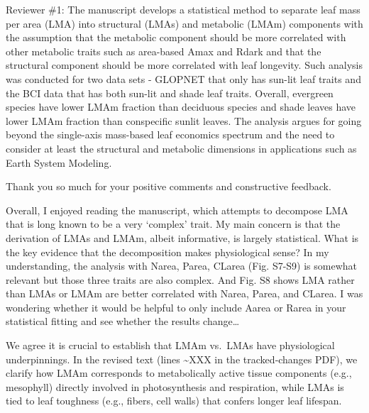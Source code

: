 \documentclass[
  12pt,
  letterpaper,
  DIV=11,
  numbers=noendperiod]{scrartcl}
\renewenvironment{quote}
  {\begin{customblockquote}\color{blockquote-text}\ignorespaces}
  {\end{customblockquote}}
\begin{document}
\begin{quote}
Reviewer \#1: The manuscript develops a statistical method to separate
leaf mass per area (LMA) into structural (LMAs) and metabolic (LMAm)
components with the assumption that the metabolic component should be
more correlated with other metabolic traits such as area-based Amax and
Rdark and that the structural component should be more correlated with
leaf longevity. Such analysis was conducted for two data sets - GLOPNET
that only has sun-lit leaf traits and the BCI data that has both sun-lit
and shade leaf traits. Overall, evergreen species have lower LMAm
fraction than deciduous species and shade leaves have lower LMAm
fraction than conspecific sunlit leaves. The analysis argues for going
beyond the single-axis mass-based leaf economics spectrum and the need
to consider at least the structural and metabolic dimensions in
applications such as Earth System Modeling.
\end{quote}

Thank you so much for your positive comments and constructive feedback.

\begin{quote}
Overall, I enjoyed reading the manuscript, which attempts to decompose
LMA that is long known to be a very `complex' trait. My main concern is
that the derivation of LMAs and LMAm, albeit informative, is largely
statistical. What is the key evidence that the decomposition makes
physiological sense? In my understanding, the analysis with Narea,
Parea, CLarea (Fig. S7-S9) is somewhat relevant but those three traits
are also complex. And Fig. S8 shows LMA rather than LMAs or LMAm are
better correlated with Narea, Parea, and CLarea. I was wondering whether
it would be helpful to only include Aarea or Rarea in your statistical
fitting and see whether the results change\ldots{}
\end{quote}

We agree it is crucial to establish that LMAm vs.~LMAs have
physiological underpinnings. In the revised text (lines
\textasciitilde XXX in the tracked‐changes PDF), we clarify how LMAm
corresponds to metabolically active tissue components (e.g., mesophyll)
directly involved in photosynthesis and respiration, while LMAs is tied
to leaf toughness (e.g., fibers, cell walls) that confers longer leaf
lifespan.
\end{document}
